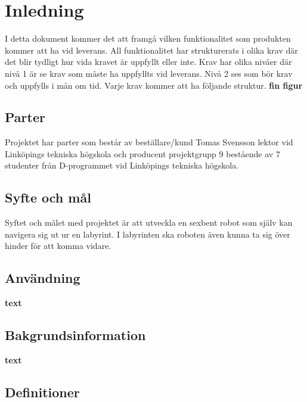 \documentclass[a4paper,titlepage,12pt]{article}
\begin{document}

	\newpage

	\section{Inledning}
	I detta dokument kommer det att framgå vilken funktionalitet som produkten kommer 
	att ha vid leverans. All funktionalitet har strukturerats i olika krav där det 
	blir tydligt hur vida kravet är uppfyllt eller inte. Krav har olika nivåer där
	nivå 1 är se krav som måste ha uppfyllts vid leverans. Nivå 2 ses som bör krav 
	och uppfylls i mån om tid. Varje krav kommer att ha följande struktur. 
	\textbf{fin figur}

	\subsection{Parter}
	Projektet har parter som består av beställare/kund Tomas Svensson lektor vid 
	Linköpings tekniska högskola och producent projektgrupp 9 bestående av 7 
	studenter från D-programmet vid Linköpings tekniska högskola. 
	\subsection{Syfte och mål}
	Syftet och målet med projektet är att utveckla en sexbent robot som själv
	kan navigera sig ut ur en labyrint. I labyrinten ska roboten även kunna ta 
	sig över hinder för att komma vidare. 
	\subsection{Användning}
	\textbf{text}
	\subsection{Bakgrundsinformation}
	\textbf{text}
	\subsection{Definitioner}

\end{document}
